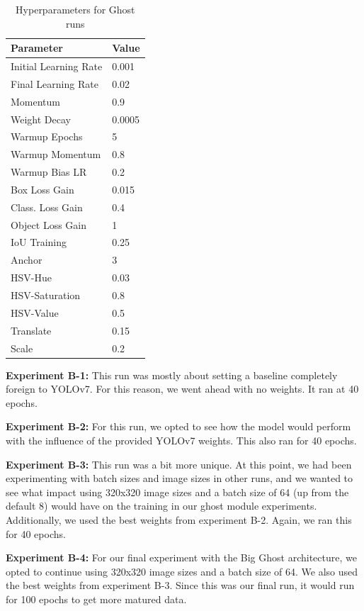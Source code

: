 \documentclass[sigplan,nonacm]{acmart}
\begin{document}
\begin{table}[H]
\centering

\begin{tabular}{|l |l|} \hline  
Parameter & Value \\ \hline 
Initial Learning Rate & 0.001 \\ \hline 
Final Learning Rate & 0.02 \\ \hline 
Momentum & 0.9 \\ \hline 
Weight Decay & 0.0005 \\ \hline 
Warmup Epochs & 5 \\ \hline 
Warmup Momentum & 0.8 \\ \hline 
Warmup Bias LR & 0.2 \\ \hline 
Box Loss Gain & 0.015 \\ \hline 
Class. Loss Gain & 0.4 \\ \hline 
Object Loss Gain & 1 \\ \hline 
IoU Training & 0.25 \\ \hline 
Anchor & 3 \\ \hline 
HSV-Hue & 0.03 \\ \hline 
HSV-Saturation & 0.8 \\ \hline 
HSV-Value & 0.5 \\ \hline 
Translate & 0.15 \\ \hline 
Scale & 0.2 \\ \hline
\end{tabular}
\caption{Hyperparameters for Ghost runs}
\label{tab:Ghostparam}
\end{table}
\textbf{Experiment B-1:}
This run was mostly about setting a baseline completely foreign to YOLOv7. For this reason, we went ahead with no weights. It ran at 40 epochs.

\textbf{Experiment B-2:}
For this run, we opted to see how the model would perform with the influence of the provided YOLOv7 weights. This also ran for 40 epochs. 

\textbf{Experiment B-3:}
This run was a bit more unique. At this point, we had been experimenting with batch sizes and image sizes in other runs, and we wanted to see what impact using 320x320 image sizes and a batch size of 64 (up from the default 8) would have on the training in our ghost module experiments. Additionally, we used the best weights from experiment B-2. Again, we ran this for 40 epochs.

\textbf{Experiment B-4:}
For our final experiment with the Big Ghost architecture, we opted to continue using 320x320 image sizes and a batch size of 64. We also used the best weights from experiment B-3. Since this was our final run, it would run for 100 epochs to get more matured data.
\end{document}
